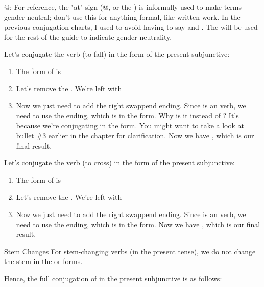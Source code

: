 \begin{conf}{@: }
	For reference, the "at" sign (@, or the ) is informally used to make terms gender neutral; don't use this for anything formal, like written work. In the previous conjugation charts, I used  to avoid having to say  and . The  will be used for the rest of the guide to indicate gender neutrality.
\end{conf}

Let's conjugate the verb  (to fall) in the  form of the present subjunctive:
\begin{enumerate}[noitemsep]
	\item The  form of  is 
	\item Let's remove the . We're left with 
	\item Now we just need to add the right swappend ending. Since  is an  verb, we need to use the  ending, which is  in the  form. Why is it  instead of ? It's because we're conjugating in the  form. You might want to take a look at bullet \#3 earlier in the chapter for clarification. Now we have , which is our final result. 
\end{enumerate}

Let's conjugate the verb  (to cross) in the  form of the present subjunctive:
\begin{enumerate}[noitemsep]
	\item The  form of  is 
	\item Let's remove the . We're left with 
	\item Now we just need to add the right swappend ending. Since  is an  verb, we need to use the  ending, which is  in the  form. Now we have , which is our final result. 
\end{enumerate}

\begin{conf}{Stem Changes}
	For stem-changing verbs (in the present tense), we do \underline{not} change the stem in the  or  forms. 
\end{conf}

Hence, the full conjugation of  in the present subjunctive is as follows: 

